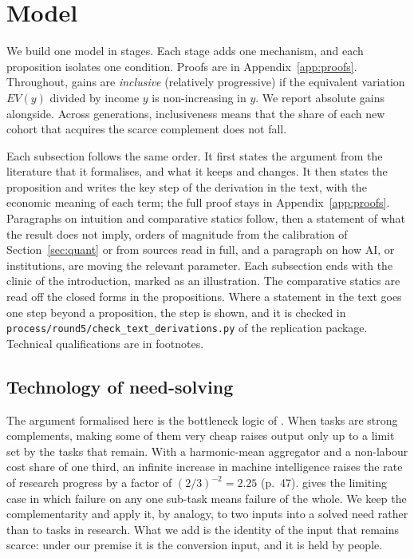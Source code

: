 \documentclass[12pt]{article}
\theoremstyle{remark}
\begin{document}
\section{Model}\label{sec:model}

We build one model in stages. Each stage adds one mechanism, and each proposition isolates one condition. Proofs are in Appendix~\ref{app:proofs}. Throughout, gains are \emph{inclusive} (relatively progressive) if the equivalent variation $EV(y)$ divided by income $y$ is non-increasing in $y$. We report absolute gains alongside. Across generations, inclusiveness means that the share of each new cohort that acquires the scarce complement does not fall.

Each subsection follows the same order. It first states the argument from the literature that it formalises, and what it keeps and changes. It then states the proposition and writes the key step of the derivation in the text, with the economic meaning of each term; the full proof stays in Appendix~\ref{app:proofs}. Paragraphs on intuition and comparative statics follow, then a statement of what the result does not imply, orders of magnitude from the calibration of Section~\ref{sec:quant} or from sources read in full, and a paragraph on how AI, or institutions, are moving the relevant parameter. Each subsection ends with the clinic of the introduction, marked as an illustration. The comparative statics are read off the closed forms in the propositions. Where a statement in the text goes one step beyond a proposition, the step is shown, and it is checked in \texttt{process/round5/check\_text\_derivations.py} of the replication package. Technical qualifications are in footnotes.

\subsection{Technology of need-solving}\label{sec:tech}

The argument formalised here is the bottleneck logic of \citet{jones2026rd}. When tasks are strong complements, making some of them very cheap raises output only up to a limit set by the tasks that remain. With a harmonic-mean aggregator and a non-labour cost share of one third, an infinite increase in machine intelligence raises the rate of research progress by a factor of $(2/3)^{-2}=2.25$ (p.~47). \citet{kremer1993oring} gives the limiting case in which failure on any one sub-task means failure of the whole. We keep the complementarity and apply it, by analogy, to two inputs into a solved need rather than to tasks in research. What we add is the identity of the input that remains scarce: under our premise it is the conversion input, and it is held by people.
\end{document}
